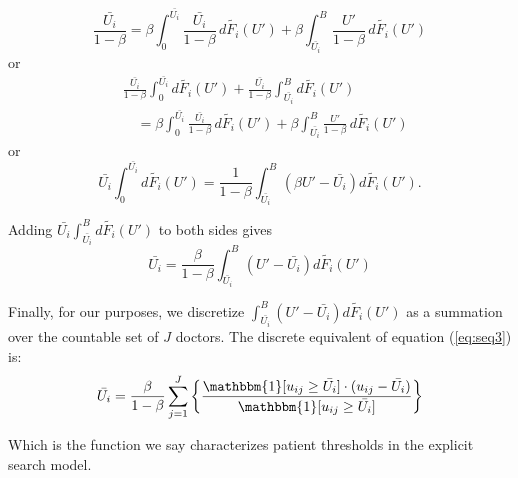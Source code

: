 \documentclass[../main.tex]{subfiles}
\begin{document}
$$
\frac{\bar{U_i}}{1-\beta}= \beta \int_0^{\bar{U_i}} \frac{\bar{U_i}}{1-\beta} \, d \tilde{F_i}(U') + \beta \int_{\bar{U_i}}^B \frac{U'}{1-\beta} \, d \tilde{F_i}(U')
$$
or
$$
\begin{aligned}
& \frac{\bar{U_i}}{1-\beta} \int_0^{\bar{U_i}} d \tilde{F_i}(U') + \frac{\bar{U_i}}{1-\beta} \int_{\bar{U_i}}^B d \tilde{F_i}(U') \\
& \quad = \beta \int_0^{\bar{U_i}} \frac{\bar{U_i}}{1-\beta} \, d \tilde{F_i}(U') + \beta \int_{\bar{U_i}}^B \frac{U'}{1-\beta} \, d \tilde{F_i}(U')
\end{aligned}
$$
or
$$
\bar{U_i} \int_0^{\bar{U_i}} d \tilde{F_i}(U') = \frac{1}{1-\beta} \int_{\bar{U_i}}^B \left(\beta U' - \bar{U_i}\right) d \tilde{F_i}(U') .
$$

Adding $\bar{U_i} \int_{\bar{U_i}}^B d \tilde{F_i}(U')$ to both sides gives
\begin{equation}
    \bar{U_i} = \frac{\beta}{1-\beta} \int_{\bar{U_i}}^B \left(U' - \bar{U_i}\right) d \tilde{F_i}(U')
    \label{eq:seq3}  
\end{equation}


Finally, for our purposes, we discretize $\int_{\bar{U_i}}^B \left(U' - \bar{U_i}\right) d \tilde{F_i}(U')$ as a summation over the countable set of $J$ doctors. The discrete equivalent of equation (\ref{eq:seq3}) is:
\begin{equation}
    \bar{U_i} = \frac{\beta}{1-\beta}  \sum_{j=1}^{J} \left\{ \frac{\mathbbm{1}[ u_{ij} \geq \bar{U_i} ] \cdot (u_{ij} - \bar{U_i})}{\mathbbm{1}[ u_{ij} \geq \bar{U_i} ]} \right\}
    \label{eq:seq4}  
\end{equation}

Which is the function we say characterizes patient thresholds in the explicit search model.
\end{document}
